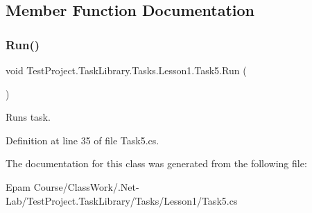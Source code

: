 \subsection{Member Function Documentation}
\mbox{\label{class_test_project_1_1_task_library_1_1_tasks_1_1_lesson1_1_1_task5_af7d77924eac62b3fe09bc77253ee565b}} 
\subsubsection{\texorpdfstring{Run()}{Run()}}
{\footnotesize\ttfamily void Test\+Project.\+Task\+Library.\+Tasks.\+Lesson1.\+Task5.\+Run (\begin{DoxyParamCaption}{ }\end{DoxyParamCaption})}



Runs task. 



Definition at line 35 of file Task5.\+cs.



The documentation for this class was generated from the following file\+:\begin{DoxyCompactItemize}
\item 
Epam Course/\+Class\+Work/.\+Net-\/\+Lab/\+Test\+Project.\+Task\+Library/\+Tasks/\+Lesson1/Task5.\+cs\end{DoxyCompactItemize}
